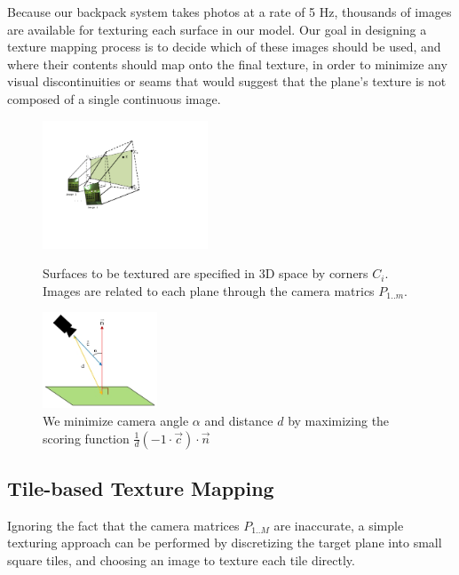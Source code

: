 \documentclass[]{spie}  %
\begin{document}
Because our backpack system takes photos at a rate of 5 Hz, thousands
of images are available for texturing each surface in our model. Our
goal in designing a texture mapping process is to decide which of
these images should be used, and where their contents should map onto
the final texture, in order to minimize any visual discontinuities or
seams that would suggest that the plane's texture is not composed of a
single continuous image.

\begin{figure}
  \begin{minipage}[b]{0.45\linewidth}
    \centering
    \includegraphics[height=1.5in]{Projection.pdf}
    \caption{Surfaces to be textured are specified in 3D space by
      corners $C_i$. Images are related to each plane through the
      camera matrics $P_{1..m}$. }
    \label{fig:projection}
  \end{minipage}
  \hspace{0.5cm}
  \begin{minipage}[b]{0.45\linewidth}
    \centering
    \includegraphics[height=1.125in]{scoringFunction.jpg}
    \caption{We minimize camera angle $\alpha$ and distance $d$ by
      maximizing the scoring function $\frac{1}{d} (-1 \cdot \vec{c})
      \cdot \vec{n}$}
    \label{fig:scoringFunction}
  \end{minipage}
\end{figure}


\subsection{Tile-based Texture Mapping}
\label{sec:tileBasedMapping}
Ignoring the fact that the camera matrices $P_{1..M}$ are inaccurate,
a simple texturing approach can be performed by discretizing the
target plane into small square tiles, and choosing an image to texture
each tile directly.
\end{document}
